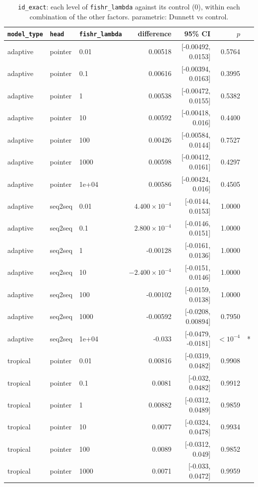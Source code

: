 \documentclass[10pt]{article}
\begin{document}
{\small
\begin{longtable}{lllrrrl}
\caption{\texttt{id\_exact}: each level of \texttt{fishr\_lambda} against its control (0), within each combination of the other factors. parametric: Dunnett vs control.}\label{tab:control-id_exact}\\
\toprule
\texttt{model\_type} & \texttt{head} & \texttt{fishr\_lambda} & difference & 95\% CI & $p$ & \\
\midrule
\endhead
adaptive & pointer & 0.01 & 0.00518 & [-0.00492, 0.0153] & 0.5764 & \\
adaptive & pointer & 0.1 & 0.00616 & [-0.00394, 0.0163] & 0.3995 & \\
adaptive & pointer & 1 & 0.00538 & [-0.00472, 0.0155] & 0.5382 & \\
adaptive & pointer & 10 & 0.00592 & [-0.00418, 0.016] & 0.4400 & \\
adaptive & pointer & 100 & 0.00426 & [-0.00584, 0.0144] & 0.7527 & \\
adaptive & pointer & 1000 & 0.00598 & [-0.00412, 0.0161] & 0.4297 & \\
adaptive & pointer & 1e+04 & 0.00586 & [-0.00424, 0.016] & 0.4505 & \\
adaptive & seq2seq & 0.01 & $4.400\times10^{-4}$ & [-0.0144, 0.0153] & 1.0000 & \\
adaptive & seq2seq & 0.1 & $2.800\times10^{-4}$ & [-0.0146, 0.0151] & 1.0000 & \\
adaptive & seq2seq & 1 & -0.00128 & [-0.0161, 0.0136] & 1.0000 & \\
adaptive & seq2seq & 10 & $-2.400\times10^{-4}$ & [-0.0151, 0.0146] & 1.0000 & \\
adaptive & seq2seq & 100 & -0.00102 & [-0.0159, 0.0138] & 1.0000 & \\
adaptive & seq2seq & 1000 & -0.00592 & [-0.0208, 0.00894] & 0.7950 & \\
adaptive & seq2seq & 1e+04 & -0.033 & [-0.0479, -0.0181] & $<10^{-4}$ & *\\
tropical & pointer & 0.01 & 0.00816 & [-0.0319, 0.0482] & 0.9908 & \\
tropical & pointer & 0.1 & 0.0081 & [-0.032, 0.0482] & 0.9912 & \\
tropical & pointer & 1 & 0.00882 & [-0.0312, 0.0489] & 0.9859 & \\
tropical & pointer & 10 & 0.0077 & [-0.0324, 0.0478] & 0.9934 & \\
tropical & pointer & 100 & 0.0089 & [-0.0312, 0.049] & 0.9852 & \\
tropical & pointer & 1000 & 0.0071 & [-0.033, 0.0472] & 0.9959 & \\

\end{longtable}}
\end{document}
